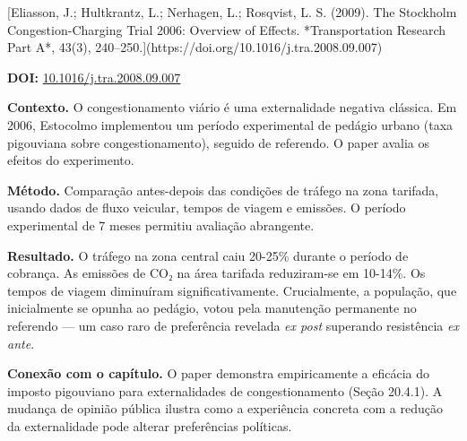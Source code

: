 \documentclass[11pt,twoside,openright]{book}
\begin{document}
\begin{pesquisabox}{[Eliasson, J.; Hultkrantz, L.; Nerhagen, L.; Rosqvist, L. S. (2009). The Stockholm Congestion-Charging Trial 2006: Overview of Effects. *Transportation Research Part A*, 43(3), 240–250.](https://doi.org/10.1016/j.tra.2008.09.007)}

\textbf{DOI:}
\href{https://doi.org/10.1016/j.tra.2008.09.007}{10.1016/j.tra.2008.09.007}

\textbf{Contexto.} O congestionamento viário é uma externalidade
negativa clássica. Em 2006, Estocolmo implementou um período
experimental de pedágio urbano (taxa pigouviana sobre congestionamento),
seguido de referendo. O paper avalia os efeitos do experimento.

\textbf{Método.} Comparação antes-depois das condições de tráfego na
zona tarifada, usando dados de fluxo veicular, tempos de viagem e
emissões. O período experimental de 7 meses permitiu avaliação
abrangente.

\textbf{Resultado.} O tráfego na zona central caiu 20-25\% durante o
período de cobrança. As emissões de CO₂ na área tarifada reduziram-se em
10-14\%. Os tempos de viagem diminuíram significativamente.
Crucialmente, a população, que inicialmente se opunha ao pedágio, votou
pela manutenção permanente no referendo --- um caso raro de preferência
revelada \emph{ex post} superando resistência \emph{ex ante}.

\textbf{Conexão com o capítulo.} O paper demonstra empiricamente a
eficácia do imposto pigouviano para externalidades de congestionamento
(Seção 20.4.1). A mudança de opinião pública ilustra como a experiência
concreta com a redução da externalidade pode alterar preferências
políticas.

\end{pesquisabox}
\end{document}
